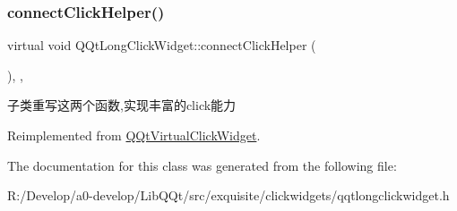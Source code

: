 \subsubsection{\texorpdfstring{connect\+Click\+Helper()}{connectClickHelper()}}
{\footnotesize\ttfamily virtual void Q\+Qt\+Long\+Click\+Widget\+::connect\+Click\+Helper (\begin{DoxyParamCaption}{ }\end{DoxyParamCaption})\hspace{0.3cm}{\ttfamily [inline]}, {\ttfamily [protected]}, {\ttfamily [virtual]}}

子类重写这两个函数,实现丰富的click能力 

Reimplemented from \mbox{\hyperlink{class_q_qt_virtual_click_widget_a2e9874c5ec5aba763426dcacb012d7a7}{Q\+Qt\+Virtual\+Click\+Widget}}.



The documentation for this class was generated from the following file\+:\begin{DoxyCompactItemize}
\item 
R\+:/\+Develop/a0-\/develop/\+Lib\+Q\+Qt/src/exquisite/clickwidgets/qqtlongclickwidget.\+h\end{DoxyCompactItemize}
